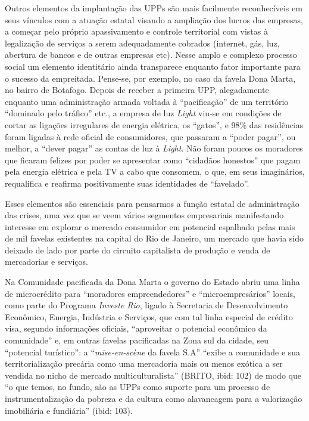 Outros elementos da implantação das UPPs são mais facilmente
reconhecíveis em seus vínculos com a atuação estatal visando a ampliação
dos lucros das empresas, a começar pelo próprio apassivamento e controle
territorial com vistas à legalização de serviços a serem adequadamente
cobrados (internet, gás, luz, abertura de bancos e de outras empresas
etc). Nesse amplo e complexo processo social um elemento identitário
ainda transparece enquanto fator importante para o sucesso da
empreitada. Pense-se, por exemplo, no caso da favela Dona Marta, no
bairro de Botafogo. Depois de receber a primeira UPP, alegadamente
enquanto uma administração armada voltada à ``pacificação'' de um
território ``dominado pelo tráfico'' etc., a empresa de luz \emph{Light}
viu-se em condições de cortar as ligações irregulares de energia
elétrica, os ``gatos'', e 98\% das residências foram ligadas à rede
oficial de consumidores, que passaram a ``poder pagar'', ou melhor, a
``dever pagar'' as contas de luz à \emph{Light}. Não foram poucos os
moradores que ficaram felizes por poder se apresentar como ``cidadãos
honestos'' que pagam pela energia elétrica e pela TV a cabo que
consomem, o que, em seus imaginários, requalifica e reafirma
positivamente suas identidades de ``favelado''.

Esses elementos são essenciais para pensarmos a função estatal de
administração das crises, uma vez que se veem vários segmentos
empresariais manifestando interesse em explorar o mercado consumidor em
potencial espalhado pelas mais de mil favelas existentes na capital do
Rio de Janeiro, um mercado que havia sido deixado de lado por parte do
circuito capitalista de produção e venda de mercadorias e serviços.

Na Comunidade pacificada da Dona Marta o governo do Estado abriu uma
linha de microcrédito para ``moradores empreendedores'' e
``microempresários'' locais, como parte do Programa \emph{Investe Rio},
ligado à Secretaria de Desenvolvimento Econômico, Energia, Indústria e
Serviços, que com tal linha especial de crédito visa, segundo
informações oficiais, ``aproveitar o potencial econômico da comunidade''
e, em outras favelas pacificadas na Zona sul da cidade, seu ``potencial
turístico'': a ``\emph{mise-en-scène} da favela S.A'' ``exibe a
comunidade e sua territorialização precária como uma mercadoria mais ou
menos exótica a ser vendida no nicho de mercado multiculturalista''
(BRITO, ibid: 102) de modo que ``o que temos, no fundo, são as UPPs como
suporte para um processo de instrumentalização da pobreza e da cultura
como alavancagem para a valorização imobiliária e fundiária'' (ibid:
103).


